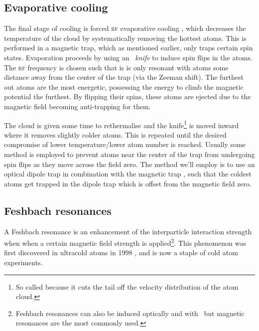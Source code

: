 \subsection{Evaporative cooling}

The final stage of cooling is forced \textsc{rf} evaporative cooling \cite{hess_evaporative_1986, anderson_observation_1995}, which decreases the temperature of the cloud by systematically removing the hottest atoms. This is performed in a magnetic trap, which as mentioned earlier, only traps certain spin states. Evaporation proceeds by using an \emph{\rf\ knife} to induce spin flips in the atoms. The \textsc{rf} frequency is chosen such that is is only resonant with atoms some distance away from the center of the trap (via the Zeeman shift). The furthest out atoms are the most energetic, possessing the energy to climb the magnetic potential the furthest. By flipping their spins, these atoms are ejected due to the magnetic field becoming anti-trapping for them.

The cloud is given some time to rethermalise and the knife\footnote{So called because it cuts the tail off the velocity distribution of the atom cloud.} is moved inward where it removes slightly colder atoms. This is repeated until the desired compromise of lower temperature/lower atom number is reached. Usually some method is employed to prevent atoms near the center of the trap from undergoing spin flips \cite{brink_majorana_2006} as they move across the field zero. The method we'll employ is to use an optical dipole trap in combination with the magnetic trap \cite{lin_rapid_2009}, such that the coldest atoms get trapped in the dipole trap which is offset from the magnetic field zero.

\subsection{Feshbach resonances}

A Feshbach resonance \cite{chin_feshbach_2010} is an enhancement of the interparticle interaction strength when when a certain magnetic field strength is applied\footnote{Feshbach resonances can also be induced optically and with \rf\, but magnetic resonances are the most commonly used.}. This phenomenon was first discovered in ultracold atoms in 1998 \cite{inouye_observation_1998}, and is now a staple of cold atom experiments.

